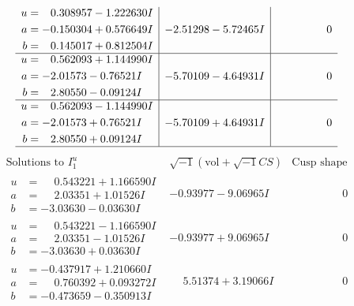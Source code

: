 \documentclass[1p]{elsarticle_modified}
\theoremstyle{definition}
\newcommand{\I}{\sqrt{-1}}
\begin{document}
$$\begin{array}{c|c|c}
\begin{aligned}
u &= \phantom{-}0.308957 - 1.222630 I \\
a &= -0.150304 + 0.576649 I \\
b &= \phantom{-}0.145017 + 0.812504 I\end{aligned}
 & -2.51298 - 5.72465 I & \phantom{-0.000000 } 0 \\ \hline\begin{aligned}
u &= \phantom{-}0.562093 + 1.144990 I \\
a &= -2.01573 - 0.76521 I \\
b &= \phantom{-}2.80550 - 0.09124 I\end{aligned}
 & -5.70109 - 4.64931 I & \phantom{-0.000000 } 0 \\ \hline\begin{aligned}
u &= \phantom{-}0.562093 - 1.144990 I \\
a &= -2.01573 + 0.76521 I \\
b &= \phantom{-}2.80550 + 0.09124 I\end{aligned}
 & -5.70109 + 4.64931 I & \phantom{-0.000000 } 0\\
 \hline 
 \end{array}$$\newpage$$\begin{array}{c|c|c}  
\text{Solutions to }I^u_{1}& \I (\text{vol} + \sqrt{-1}CS) & \text{Cusp shape}\\
 \hline 
\begin{aligned}
u &= \phantom{-}0.543221 + 1.166590 I \\
a &= \phantom{-}2.03351 + 1.01526 I \\
b &= -3.03630 - 0.03630 I\end{aligned}
 & -0.93977 - 9.06965 I & \phantom{-0.000000 } 0 \\ \hline\begin{aligned}
u &= \phantom{-}0.543221 - 1.166590 I \\
a &= \phantom{-}2.03351 - 1.01526 I \\
b &= -3.03630 + 0.03630 I\end{aligned}
 & -0.93977 + 9.06965 I & \phantom{-0.000000 } 0 \\ \hline\begin{aligned}
u &= -0.437917 + 1.210660 I \\
a &= \phantom{-}0.760392 + 0.093272 I \\
b &= -0.473659 - 0.350913 I\end{aligned}
 & \phantom{-}5.51374 + 3.19066 I & \phantom{-0.000000 } 0 \\ \hline\begin{aligned}

\end{aligned}
\end{array}$$
\end{document}
